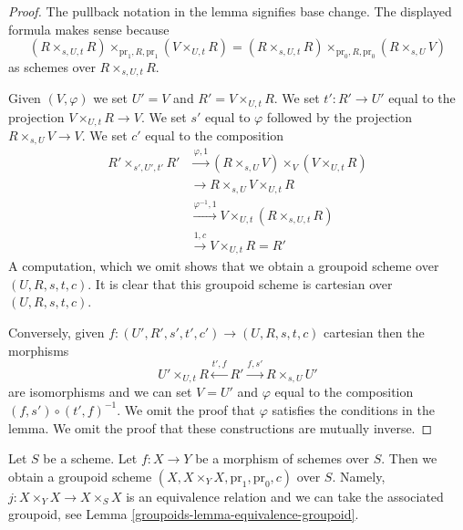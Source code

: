 \begin{proof}
The pullback notation in the lemma signifies base change. The displayed
formula makes sense because
$$
(R \times_{s, U, t} R) \times_{\text{pr}_1, R, \text{pr}_1} (V \times_{U, t} R)
=
(R \times_{s, U, t} R) \times_{\text{pr}_0, R, \text{pr}_0} (R \times_{s, U} V)
$$
as schemes over $R \times_{s, U, t} R$.

\medskip\noindent
Given $(V, \varphi)$ we set $U' = V$ and $R' = V \times_{U, t} R$.
We set $t' : R' \to U'$ equal to the projection $V \times_{U, t} R \to V$.
We set $s'$ equal to $\varphi$ followed by the projection
$R \times_{s, U} V \to V$. We set $c'$ equal to the composition
\begin{align*}
R' \times_{s', U', t'} R'
& \xrightarrow{\varphi, 1}
(R \times_{s, U} V) \times_V (V \times_{U, t} R) \\
& \xrightarrow{}
R \times_{s, U} V \times_{U, t} R \\
& \xrightarrow{\varphi^{-1}, 1}
V \times_{U, t} (R \times_{s, U, t} R) \\
& \xrightarrow{1, c}
V \times_{U, t} R = R'
\end{align*}
A computation, which we omit shows that we obtain a groupoid scheme
over $(U, R, s, t, c)$. It is clear that this groupoid scheme is
cartesian over $(U, R, s, t, c)$.

\medskip\noindent
Conversely, given $f : (U', R', s', t', c') \to (U, R, s, t, c)$
cartesian then the morphisms
$$
U' \times_{U, t} R \xleftarrow{t', f} R' \xrightarrow{f, s'} R \times_{s, U} U'
$$
are isomorphisms and we can set $V = U'$ and $\varphi$ equal to the
composition $(f, s') \circ (t', f)^{-1}$. We omit the proof that
$\varphi$ satisfies the conditions in the lemma. We omit the proof that
these constructions are mutually inverse.
\end{proof}

Let $S$ be a scheme. Let $f : X \to Y$ be a morphism of schemes over $S$. Then
we obtain a groupoid scheme $(X, X \times_Y X, \text{pr}_1, \text{pr}_0, c)$
over $S$. Namely, $j : X \times_Y X \to X \times_S X$ is an equivalence
relation and we can take the associated groupoid, see
Lemma \ref{groupoids-lemma-equivalence-groupoid}.

